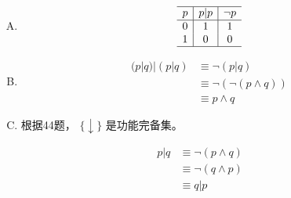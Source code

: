 {{        %
        \begin{practices}
            \begin{enumerate}[A.]
                \item
                {
                    \begin{table}[H]
                        \[
                            \begin{array}{c|c|c}
                                \hline
                                p & p | p & \neg p \\
                                \hline
                                0 & 1 & 1 \\
                                1 & 0 & 0 \\
                                \hline
                           \end{array}
                       \]
                    \end{table}
                }
                \item
                {
                    \begin{align*}
                        (p | q) | (p | q)
                        &\equiv \neg (p | q) \\
                        &\equiv \neg (\neg (p \wedge q)) \\
                        &\equiv p \wedge q
                    \end{align*}
                }
                \item
                {
                    根据44题， $\{\downarrow\}$ 是功能完备集。
                }
            \end{enumerate}
        \end{practices}

        \begin{practices}
            \begin{align*}
                p | q
                &\equiv \neg (p \wedge q) \\
                &\equiv \neg (q \wedge p) \\
                &\equiv q | p
            \end{align*}
        \end{practices}

}}
